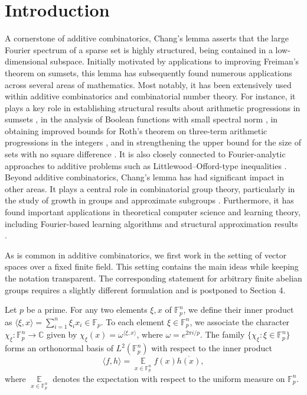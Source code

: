 \documentclass[11pt,reqno]{amsart}
\theoremstyle{plain}
\theoremstyle{remark}
\begin{document}
\section{Introduction}
A cornerstone of additive combinatorics, Chang’s lemma \cite{Chang2002} asserts that the large Fourier spectrum of a sparse set is highly structured, being contained in a low-dimensional subspace. Initially motivated by applications to improving Freiman’s theorem on sumsets, this lemma has subsequently found numerous applications across several areas of mathematics.  Most notably, it has been extensively used within additive combinatorics and combinatorial number theory. For instance, it plays a key role in establishing structural results about arithmetic progressions in sumsets \cite{green2008quantitative}, in the analysis of Boolean functions with small spectral norm \cite{green2008boolean}, in obtaining improved bounds for Roth’s theorem on three-term arithmetic progressions in the integers \cite{sanders2011roth, bloom2016quantitative, bloom2020breaking}, and in strengthening the upper bound for the size of sets with no square difference \cite{bloom2022new}. It is also closely connected to Fourier-analytic approaches to additive problems such as Littlewood–Offord-type inequalities \cite{sanders2007littlewood}. Beyond additive combinatorics, Chang’s lemma has had significant impact in other areas. It plays a central role in combinatorial group theory, particularly in the study of growth in groups and approximate subgroups \cite{Breuillard2012, helfgott2015growth}. Furthermore, it has found important applications in theoretical computer science and learning theory, including Fourier-based learning algorithms and structural approximation results \cite{tsang2013fourier, chan2016approximate, lee2019fourier, asadi2022worst}.


As is common in additive combinatorics, we first work in the setting of vector spaces over a fixed finite field. This setting contains the main ideas while keeping the notation transparent. The corresponding statement for arbitrary finite abelian groups
requires a slightly different formulation and is postponed to Section 4.

Let $p$ be a prime. For any two elements $\xi,x$ of $\mathbb{F}_p^n$, we define their inner product as $\langle \xi,x\rangle = \sum_{i=1}^n \xi_i x_i \in \mathbb{F}_p$. To each element $\xi\in\mathbb{F}_p^n$, we associate the character $\chi_\xi:\mathbb{F}_p^n\to\mathbb{C}$ given by $\chi_\xi(x)=\omega^{\langle \xi,x\rangle}$, where $\omega=e^{2\pi i/p}$. The family $\{\chi_\xi:\xi\in\mathbb{F}_p^n\}$ forms an orthonormal basis of $L^2(\mathbb{F}_p^n)$ with respect to the inner product $$\langle f,h\rangle=\mathop{\mathbb E}\limits_{x\in\mathbb{F}_p^n}f(x)\overline{h(x)},$$ where  $\mathop{\mathbb E}\limits_{x\in\mathbb{F}_p^n}$ denotes the expectation with respect to the uniform measure on $\mathbb{F}_p^n$.
\end{document}
